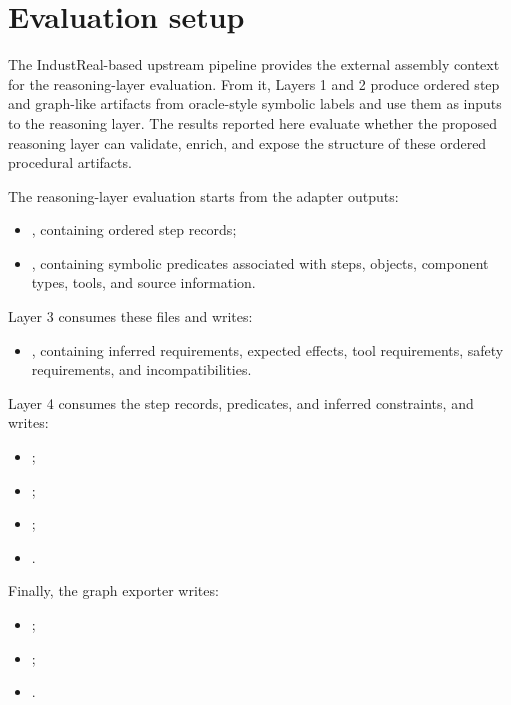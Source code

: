 \section{Evaluation setup}
\label{sec:evaluation-setup}

The IndustReal-based upstream pipeline provides the external assembly context for
the reasoning-layer evaluation. From it, Layers 1 and 2 produce ordered step and graph-like artifacts from oracle-style symbolic labels and use them as inputs to
the reasoning layer. The results reported here evaluate whether the proposed reasoning layer can validate, enrich, and expose the structure of these
ordered procedural artifacts.

The reasoning-layer evaluation starts from the adapter outputs:
\begin{itemize}
    \item {}, containing ordered step records;
    \item {}, containing symbolic predicates associated with steps, objects, component types, tools, and source information.
\end{itemize}

Layer 3 consumes these files and writes:
\begin{itemize}
    \item {}, containing inferred requirements, expected effects, tool requirements, safety requirements, and incompatibilities.
\end{itemize}

Layer 4 consumes the step records, predicates, and inferred constraints, and writes:
\begin{itemize}
    \item {};
    \item {};
    \item {};
    \item {}.
\end{itemize}

Finally, the graph exporter writes:
\begin{itemize}
    \item {};
    \item {};
    \item {}.
\end{itemize}

